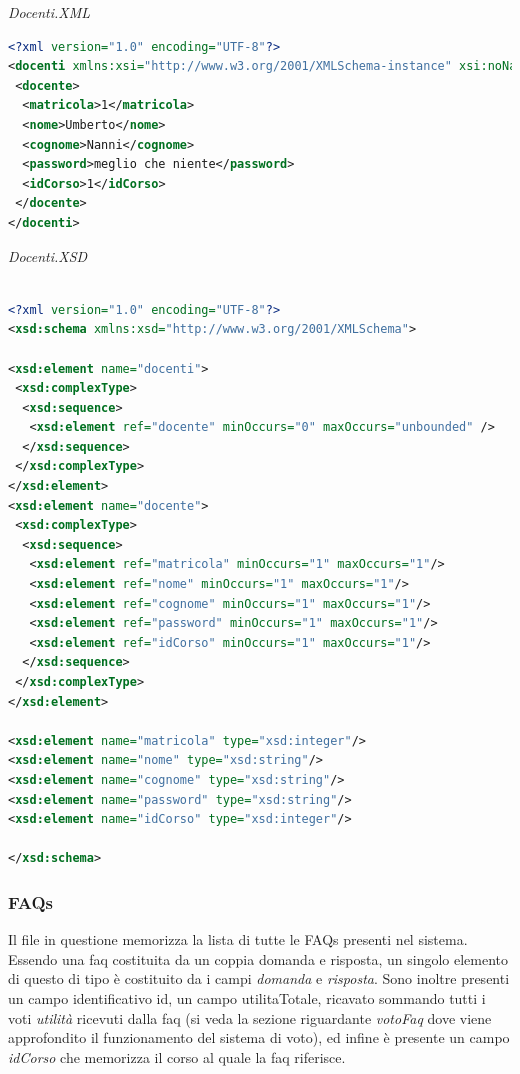 \documentclass [a4paper,11pt]{book}
\begin{document}
\medskip

\emph{Docenti.XML}

\begin{lstlisting}[language=XML]
<?xml version="1.0" encoding="UTF-8"?>
<docenti xmlns:xsi="http://www.w3.org/2001/XMLSchema-instance" xsi:noNamespaceSchemaLocation="docenti.xsd">
 <docente>
  <matricola>1</matricola>
  <nome>Umberto</nome>
  <cognome>Nanni</cognome>
  <password>meglio che niente</password>
  <idCorso>1</idCorso>
 </docente>
</docenti>
\end{lstlisting}

\medskip

\emph{Docenti.XSD}

\begin{lstlisting}[language=XML]

<?xml version="1.0" encoding="UTF-8"?>
<xsd:schema xmlns:xsd="http://www.w3.org/2001/XMLSchema">

<xsd:element name="docenti">
 <xsd:complexType>
  <xsd:sequence>
   <xsd:element ref="docente" minOccurs="0" maxOccurs="unbounded" />
  </xsd:sequence>
 </xsd:complexType>
</xsd:element>
<xsd:element name="docente">
 <xsd:complexType>
  <xsd:sequence>
   <xsd:element ref="matricola" minOccurs="1" maxOccurs="1"/>
   <xsd:element ref="nome" minOccurs="1" maxOccurs="1"/>
   <xsd:element ref="cognome" minOccurs="1" maxOccurs="1"/>
   <xsd:element ref="password" minOccurs="1" maxOccurs="1"/>
   <xsd:element ref="idCorso" minOccurs="1" maxOccurs="1"/>
  </xsd:sequence>
 </xsd:complexType>
</xsd:element>

<xsd:element name="matricola" type="xsd:integer"/>
<xsd:element name="nome" type="xsd:string"/>
<xsd:element name="cognome" type="xsd:string"/>
<xsd:element name="password" type="xsd:string"/>
<xsd:element name="idCorso" type="xsd:integer"/>
  
</xsd:schema>
\end{lstlisting}

\medskip

\subsubsection{FAQs}

Il file in questione memorizza la lista di tutte le FAQs presenti nel sistema. Essendo una faq costituita da un coppia domanda e risposta, un singolo elemento di questo di tipo è costituito da i campi \emph{domanda} e \emph{risposta}. Sono inoltre presenti un campo identificativo id, un campo utilitaTotale, ricavato sommando tutti i voti \emph{utilità} ricevuti dalla faq (si veda la sezione riguardante \emph{votoFaq} dove viene approfondito il funzionamento del sistema di voto), ed infine è presente un campo \emph{idCorso} che memorizza il corso al quale la faq riferisce.
\end{document}

